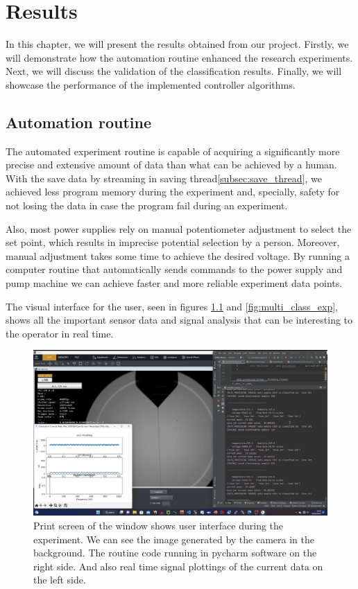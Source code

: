\chapter{Results}
\label{chap:Results}

In this chapter, we will present the results obtained from our project. Firstly, we will demonstrate how the automation routine enhanced the research experiments. Next, we will discuss the validation of the classification results. Finally, we will showcase the performance of the implemented controller algorithms.

\section{Automation routine}
\label{sec:automation_routine}

The automated experiment routine is capable of acquiring a significantly more precise and extensive amount of data than what can be achieved by a human. 
With the save data by streaming in saving thread\ref{subsec:save_thread}, we achieved less program memory during the experiment and, specially, safety for not losing the data in case the program fail during an experiment.

Also, most power supplies rely on manual potentiometer adjustment to select the set point, which results in imprecise potential selection by a person. 
Moreover, manual adjustment takes some time to achieve the desired voltage. 
By running a computer routine that automatically sends commands to the power supply and pump machine we can achieve faster and more reliable experiment data points.

The visual interface for the user, seen in figures \ref{fig:multi_class_exp1} and \ref{fig:multi_class_exp}, shows all the important sensor data and signal analysis that can be interesting to the operator in real time.

\begin{figure}[H]
    \center
    \includegraphics[width=16cm]{Figuras/19:03/axs1.png}
    \caption{Print screen of the window shows user interface during the experiment.
        We can see the image generated by the camera in the background.
        The routine code running in pycharm software on the right side.
        And also real time signal plottings of the current data on the left side.}
        \label{fig:multi_class_exp1}
\end{figure}


